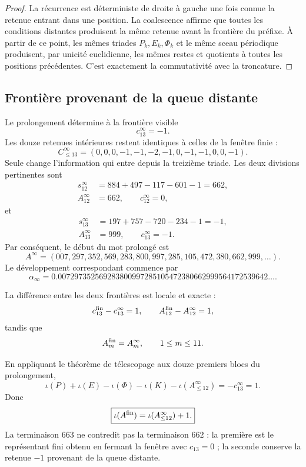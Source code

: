 \begin{proof}
La récurrence est déterministe de droite à gauche une fois connue la
retenue entrant dans une position. La coalescence affirme que toutes les
conditions distantes produisent la même retenue avant la frontière du
préfixe. À partir de ce point, les mêmes triades \(P_k,E_k,\Phi_k\) et le même
sceau périodique produisent, par unicité euclidienne, les mêmes restes et
quotients à toutes les positions précédentes. C’est exactement la
commutativité avec la troncature.
\end{proof}

\subsection{Frontière provenant de la queue distante}

Le prolongement détermine à la frontière visible
\[
 c_{13}^{\infty}=-1.
\]
Les douze retenues intérieures restent identiques à celles de la fenêtre
finie :
\[
 \boxed{
 C_{\leq13}^{\infty}
 =(0,0,0,-1,-1,-2,-1,0,-1,-1,0,0,-1).}
\]
Seule change l’information qui entre depuis la treizième triade. Les
deux divisions pertinentes sont
\[
\begin{aligned}
 s_{12}^{\infty}
 &=884+497-117-601-1=662,\\
 A_{12}^{\infty}&=662,
 \qquad c_{12}^{\infty}=0,
\end{aligned}
\]
et
\[
\begin{aligned}
 s_{13}^{\infty}
 &=197+757-720-234-1=-1,\\
 A_{13}^{\infty}&=999,
 \qquad c_{13}^{\infty}=-1.
\end{aligned}
\]
Par conséquent, le début du mot prolongé est
\[
 \boxed{
 A^{\infty}
 =(007,297,352,569,283,800,997,285,105,472,380,662,999,\ldots).}
\]
Le développement correspondant commence par
\begin{equation}
 \boxed{
 \alpha_{\infty}
 =0.007297352569283800997285105472380662999564172539642\ldots.}
 \label{p3-83-c25-s5:eq:alpha-infinita-autonoma}
\end{equation}

La différence entre les deux frontières est locale et exacte :
\[
 c_{13}^{\rm fin}-c_{13}^{\infty}=1,
 \qquad
 A_{12}^{\rm fin}-A_{12}^{\infty}=1,
\]
tandis que
\[
 A_m^{\rm fin}=A_m^\infty,
 \qquad 1\leq m\leq11.
\]

En appliquant le théorème de télescopage aux douze premiers blocs du
prolongement,
\[
 \iota(P)+\iota(E)-\iota(\Phi)-\iota(K)
 -\iota(A^\infty_{\leq12})
 =-c_{13}^{\infty}=1.
\]
Donc
\begin{equation}
 \boxed{
 \iota(A^{\rm fin})
 =\iota(A^\infty_{\leq12})+1.}
 \label{p3-83-c25-s5:eq:relacion-unidad-fronteras-alpha}
\end{equation}
La terminaison \(663\) ne contredit pas la terminaison \(662\) : la première
est le représentant fini obtenu en fermant la fenêtre avec
\(c_{13}=0\) ; la seconde conserve la retenue \(-1\) provenant de la queue
distante.

